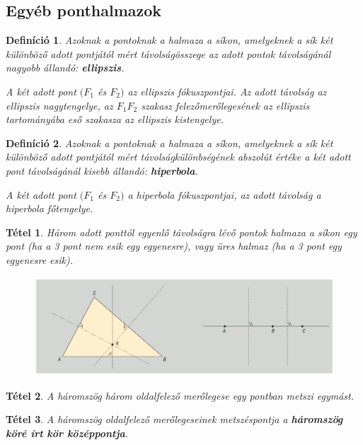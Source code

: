\documentclass[12pt,a4paper]{article}
\newtheorem{theorem}{Tétel} [section]
\newtheorem{definition}{Definíció} [section]
\begin{document}
\subsection{Egyéb ponthalmazok}
\begin{definition}
Azoknak a pontoknak a halmaza a síkon, amelyeknek a sík két különböző adott pontjától mért távolságösszege az adott pontok távolságánál nagyobb állandó: \textbf{ellipszis}.

A két adott pont $(F_1$ és $F_2)$ az ellipszis fókuszpontjai. Az adott távolság az ellipszis nagytengelye, az $F_1F_2$ szakasz felezőmerőlegesének az ellipszis tartományába eső szakasza az ellipszis kistengelye.
\end{definition}

\begin{definition}
Azoknak a pontoknak a halmaza a síkon, amelyeknek a sík két különböző adott pontjától mért távolságkülönbségének abszolút értéke a két adott pont távolságánál kisebb állandó: \textbf{hiperbola}.

A két adott pont $(F_1$ és $F_2)$ a hiperbola fókuszpontjai, az adott távolság a hiperbola főtengelye.
\end{definition}

\begin{theorem}
Három adott ponttól egyenlő távolságra lévő pontok halmaza a síkon egy pont (ha a 3 pont nem esik egy egyenesre), vagy üres halmaz (ha a 3 pont egy egyenesre esik).
\begin{figure}[h]
\centering
\includegraphics[scale=0.35]{img/haromszog_harom_pont}
\end{figure}
\end{theorem}

\begin{theorem}
A háromszög három oldalfelező merőlegese egy pontban metszi egymást.
\end{theorem}

\begin{theorem}
A háromszög oldalfelező merőlegeseinek metszéspontja a \textbf{háromszög köré írt kör középpontja}.
\end{theorem}
\end{document}
